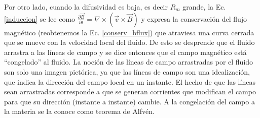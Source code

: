 \documentclass[a4paper,11pt]{report}
\begin{document}
Por otro lado, cuando la difusividad es baja, es decir $R_m$ grande, la Ec. \ref{induccion} se lee como $\frac{\partial \vec{B}}{\partial t} = \nabla \times (\vec{v} \times \vec{B})$ y expresa la conservación del flujo magnético (reobtenemos la Ec. \ref{conserv_bflux}) que atraviesa una curva cerrada que se mueve con la velocidad local del fluido. De esto se desprende que el fluido arrastra a las líneas de campo y se dice entonces que el campo magnético está ``congelado'' al fluido. La noción de las líneas de campo arrastradas por el fluido son solo una imagen pictórica, ya que las líneas de campo son una idealización, que indica la dirección del campo local en un instante. El hecho de que las líneas sean arrastradas corresponde a que se generan corrientes que modifican el campo para que su dirección (instante a instante) cambie. A la congelación del campo a la materia se la conoce como teorema de Alfvén.

\end{document}
